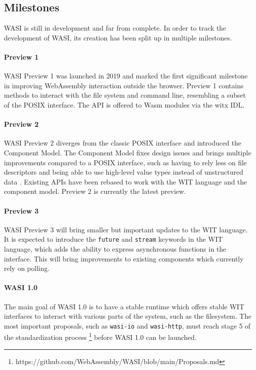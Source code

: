 \subsection{Milestones}
\acrshort{WASI} is still in development and far from complete. In order to track the development of WASI, its creation has been split up in multiple milestones.

\paragraph{Preview 1}
\acrshort{WASI} Preview 1 was launched in 2019 and marked the first significant milestone in improving WebAssembly interaction outside the browser. Preview 1 contains methods to interact with the file system and command line, resembling a subset of the \acrfull{POSIX} interface. The API is offered to \acrshort{Wasm} modules via the witx \acrfull{IDL}.

\paragraph{Preview 2}
\acrshort{WASI} Preview 2 diverges from the classic \acrshort{POSIX} interface and introduced the Component Model. The Component Model fixes design issues and brings multiple improvements compared to a \acrshort{POSIX} interface, such as having to rely less on file descriptors and being able to use high-level value types instead of unstructured data \cite{path_to_components}. Existing APIs have been rebased to work with the \acrshort{WIT} language and the component model. Preview 2 is currently the latest preview.

\paragraph{Preview 3}
\acrshort{WASI} Preview 3 will bring smaller but important updates to the \acrshort{WIT} language. It is expected to introduce the \texttt{future} and \texttt{stream} keywords in the \acrshort{WIT} language, which adds the ability to express asynchronous functions in the interface. This will bring improvements to existing components which currently rely on polling.

\paragraph{WASI 1.0}
The main goal of \acrshort{WASI} 1.0 is to have a stable runtime which offers stable WIT interfaces to interact with various parts of the system, such as the filesystem. The most important proposals, such as \texttt{wasi-io} and \texttt{wasi-http}, must reach stage 5 of the standardization process \footnote{https://github.com/WebAssembly/WASI/blob/main/Proposals.md} before WASI 1.0 can be launched. 